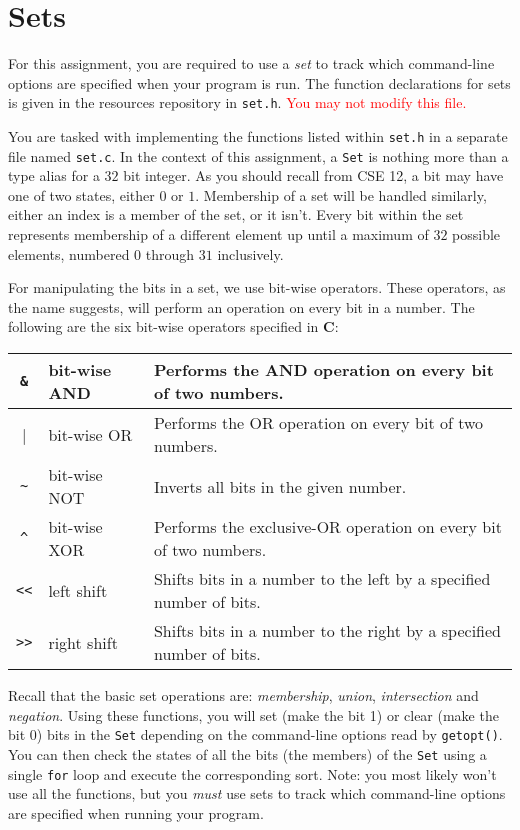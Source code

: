 \section{Sets}

For this assignment, you are required to use a \emph{set} to track which
command-line options are specified when your program is run. The
function declarations for sets is given in the resources repository in
\texttt{set.h}. \textcolor{red}{You may not modify this file.}

You are tasked with implementing the functions listed within
\texttt{set.h} in a separate file named \texttt{set.c}.  In the context
of this assignment, a \texttt{Set} is nothing more than a type alias for
a $32$ bit integer.  As you should recall from CSE 12, a bit may have
one of two states, either $0$ or $1$.  Membership of a set will be
handled similarly, either an index is a member of the set, or it isn't.
Every bit within the set represents membership of a different element
up until a maximum of $32$ possible elements, numbered $0$ through $31$
inclusively.

For manipulating the bits in a set, we use bit-wise operators. These
operators, as the name suggests, will perform an operation on every bit
in a number. The following are the six bit-wise operators specified in
\textbf{C}:

\begin{center}
  \begin{tabular}{|c|l|l|}
    \hline
    \verb|&| & bit-wise AND & Performs the AND operation on every bit
    of two numbers. \\
    \hline
    \verb||| & bit-wise OR & Performs the OR operation on every bit of
    two numbers. \\
    \hline
    \verb|~| & bit-wise NOT & Inverts all bits in the given number. \\
    \hline
    \verb|^| & bit-wise XOR & Performs the exclusive-OR operation on
    every bit of two numbers. \\
    \hline
    \verb|<<| & left shift & Shifts bits in a number to the left by a
    specified number of bits. \\
    \hline
    \verb|>>| & right shift & Shifts bits in a number to the right by a
    specified number of bits. \\
    \hline
  \end{tabular}
\end{center}

\noindent Recall that the basic set operations are: \emph{membership},
\emph{union}, \emph{intersection} and \emph{negation}.  Using these
functions, you will set (make the bit 1) or clear (make the bit 0) bits
in the \texttt{Set} depending on the command-line options read by
\texttt{getopt()}. You can then check the states of all the bits (the
members) of the \texttt{Set} using a single \texttt{for} loop and
execute the corresponding sort. Note: you most likely won't use all the
functions, but you \emph{must} use sets to track which command-line
options are specified when running your program.

